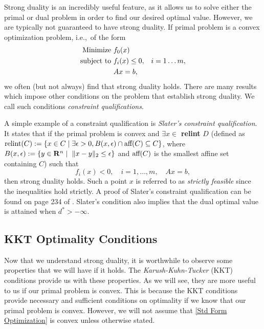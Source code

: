 	Strong duality is an incredibly useful feature, as it allows us to solve either the primal or dual problem in order to find our desired optimal value. However, we are typically not guaranteed to have strong duality. If primal problem is a convex optimization problem, i.e.,~of the form 
	$$
		\begin{aligned}
			\textnormal{Minimize } & f_0 (x) \\
			\textnormal{subject to } & f_i (x) \leq 0, & i = 1 \dots m,\\
			& Ax = b, 
		\end{aligned}	
	$$
	we often (but not always) find that strong duality holds. There are many results which impose other conditions on the problem that establish strong duality. We call such conditions \emph{constraint qualifications}. 
	
	A simple example of a constraint qualification is \emph{Slater's constraint qualification}. It states that if the primal problem is convex and $\exists x \in $ \textbf{relint} $D$ (defined as $\textnormal{relint}(C) := \{x \in C \mid \exists \epsilon > 0, B(x,\epsilon) \cap \textnormal{aff}(C) \subseteq C\}$,
	where $B(x, \epsilon) := \{y \in \mathbf{R}^n \mid \textnormal{ } \|x-y\|_2 \leq \epsilon\}$ and $\textnormal{aff}(C)$ is the smallest affine set containing $C$) such that 
	\begin{equation} \label{Slater's Condition}
		f_i (x) < 0, \quad i = 1, \dots, m, \quad Ax = b,
	\end{equation}
	then strong duality holds. Such a point $x$ is referred to as \emph{strictly feasible} since the inequalities hold strictly.  A proof of Slater's constraint qualification can be found on page 234 of \cite{boyd2004convex}. Slater's condition also implies that the dual optimal value is attained when $d^* > - \infty$. 
	
	\subsection{KKT Optimality Conditions}
	
	Now that we understand strong duality, it is worthwhile to observe some properties that we will have if it holds. The \emph{Karush-Kuhn-Tucker} (KKT) conditions provide us with these properties. As we will see, they are more useful to us if our primal problem is convex. This is because the KKT conditions provide necessary and sufficient conditions on optimality if we know that our primal problem is convex. However, we will not assume that \eqref{Std Form Optimization} is convex unless otherwise stated. 
	
